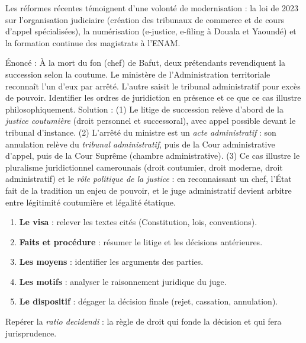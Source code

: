 \documentclass[11pt]{article}
\newcommand{\cle}[1]{{\popxbold\color{popdark}#1}}
\newcounter{popsec}
\newcounter{popsub}
\newcommand{\courssub}[1]{%
  \stepcounter{popsub}%
  \par\vspace{9pt}\noindent{\popxbold\fontsize{11.5}{13}\selectfont\color{popink}{\color{poporange}\thepopsec.\thepopsub}\hspace{6pt}#1}\par\nopagebreak\vspace{4pt}
}
\begin{document}
\courssub{Réformes récentes et étude de cas}

Les réformes récentes témoignent d'une volonté de modernisation : la \cle{loi de 2023} sur l'organisation judiciaire (création des tribunaux de commerce et de cours d'appel spécialisées), la \cle{numérisation} (e-justice, e-filing à Douala et Yaoundé) et la formation continue des magistrats à l'ENAM.

\begin{exoresolu}
Énoncé : À la mort du fon (chef) de Bafut, deux prétendants revendiquent la succession selon la coutume. Le ministère de l'Administration territoriale reconnaît l'un d'eux par arrêté. L'autre saisit le tribunal administratif pour excès de pouvoir. Identifier les ordres de juridiction en présence et ce que ce cas illustre philosophiquement.
\tcblower
Solution : (1) Le litige de succession relève d'abord de la \emph{justice coutumière} (droit personnel et successoral), avec appel possible devant le tribunal d'instance. (2) L'arrêté du ministre est un \emph{acte administratif} : son annulation relève du \emph{tribunal administratif}, puis de la Cour administrative d'appel, puis de la Cour Suprême (chambre administrative). (3) Ce cas illustre le \cle{pluralisme juridictionnel} camerounais (droit coutumier, droit moderne, droit administratif) et le \emph{rôle politique de la justice} : en reconnaissant un chef, l'État fait de la tradition un enjeu de pouvoir, et le juge administratif devient arbitre entre légitimité coutumière et légalité étatique.
\end{exoresolu}

\begin{methode}
\begin{enumerate}
\item \textbf{Le visa} : relever les textes cités (Constitution, lois, conventions).
\item \textbf{Faits et procédure} : résumer le litige et les décisions antérieures.
\item \textbf{Les moyens} : identifier les arguments des parties.
\item \textbf{Les motifs} : analyser le raisonnement juridique du juge.
\item \textbf{Le dispositif} : dégager la décision finale (rejet, cassation, annulation).
\end{enumerate}
Repérer la \emph{ratio decidendi} : la règle de droit qui fonde la décision et qui fera jurisprudence.
\end{methode}
\end{document}

